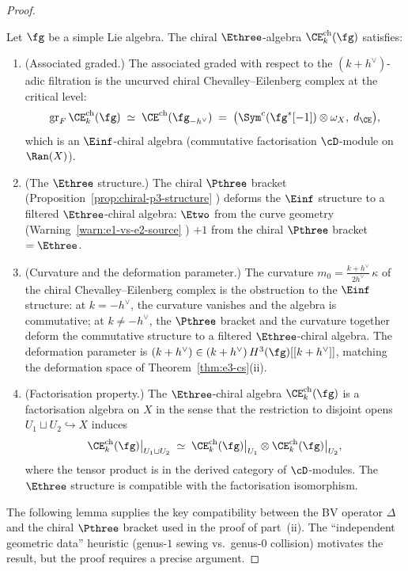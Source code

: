 \begin{proof}
\begin{theorem}
\label{thm:chiral-e3-structure}
Let $\fg$ be a simple Lie algebra.
The chiral $\Ethree$-algebra
$\CE^{\mathrm{ch}}_k(\fg)$ satisfies:
\begin{enumerate}[label=\textup{(\roman*)}]
\item \textup{(Associated graded.)}
  The associated graded with respect to the $(k+h^\vee)$-adic
  filtration is the uncurved chiral Chevalley--Eilenberg
  complex at the critical level:
  \begin{equation}\label{eq:assoc-graded}
    \mathrm{gr}_F\,\CE^{\mathrm{ch}}_k(\fg)
    \;\simeq\;
    \CE^{\mathrm{ch}}(\fg_{-h^\vee})
    \;=\;
    \bigl(\Sym^c(\fg^*[-1]) \otimes \omega_X,\; d_{\CE}\bigr),
  \end{equation}
  which is an $\Einf$-chiral algebra \textup{(}commutative
  factorisation $\cD$-module on $\Ran(X)$\textup{)}.
\item \textup{(The $\Ethree$ structure.)}
  The chiral $\Pthree$ bracket
  \textup{(}Proposition~\textup{\ref{prop:chiral-p3-structure}}%
  \textup{)} deforms the $\Einf$ structure to
  a filtered $\Ethree$-chiral algebra:
  $\Etwo$ from the curve geometry
  \textup{(}Warning~\textup{\ref{warn:e1-vs-e2-source}}%
  \textup{)} $+ 1$ from the chiral $\Pthree$ bracket
  $= \Ethree$.
\item \textup{(Curvature and the deformation parameter.)}
  The curvature
  $m_0 = \tfrac{k + h^\vee}{2h^\vee}\,\kappa$ of the chiral
  Chevalley--Eilenberg complex is the obstruction to the
  $\Einf$ structure: at $k = -h^\vee$, the curvature vanishes
  and the algebra is commutative; at $k \neq -h^\vee$, the
  $\Pthree$ bracket and the curvature together deform the
  commutative structure to a filtered $\Ethree$-chiral
  algebra.
  The deformation parameter is $(k+h^\vee) \in
  (k+h^\vee)\,H^3(\fg)[[k+h^\vee]]$,
  matching the deformation space of
  Theorem~\textup{\ref{thm:e3-cs}(ii)}.
\item \textup{(Factorisation property.)}
  The $\Ethree$-chiral algebra
  $\CE^{\mathrm{ch}}_k(\fg)$ is a factorisation algebra on
  $X$ in the sense that the restriction to disjoint
  opens $U_1 \sqcup U_2 \hookrightarrow X$ induces
  \begin{equation}\label{eq:factorisation}
    \CE^{\mathrm{ch}}_k(\fg)\big|_{U_1 \sqcup U_2}
    \;\simeq\;
    \CE^{\mathrm{ch}}_k(\fg)\big|_{U_1}
    \otimes
    \CE^{\mathrm{ch}}_k(\fg)\big|_{U_2},
  \end{equation}
  where the tensor product is in the derived category of
  $\cD$-modules. The $\Ethree$ structure is compatible with
  the factorisation isomorphism.
\end{enumerate}
\end{theorem}
The following lemma supplies the key compatibility between
the BV operator $\Delta$ and the chiral $\Pthree$ bracket
used in the proof of part~(ii). The ``independent
geometric data'' heuristic (genus-$1$ sewing vs.\
genus-$0$ collision) motivates the result, but
the proof requires a precise argument.


\end{proof}
